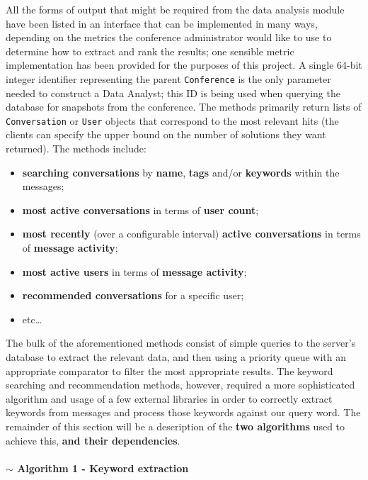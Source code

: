 \documentclass[12p, a4paper, onecolumn]{report}
\begin{document}
All the forms of output that might be required from the data analysis module have been listed in an interface that can be implemented in many ways, depending on the metrics the conference administrator would like to use to determine how to extract and rank the results; one sensible metric implementation has been provided for the purposes of this project. A single 64-bit integer identifier representing the parent \texttt{Conference} is the only parameter needed to construct a Data Analyst; this ID is being used when querying the database for snapshots from the conference. The methods primarily return lists of \texttt{Conversation} or \texttt{User} objects that correspond to the most relevant hits (the clients can specify the upper bound on the number of solutions they want returned). The methods include:
\begin{itemize}
\item \textbf{searching conversations} by \textbf{name}, \textbf{tags} and/or \textbf{keywords} within the messages;
\item \textbf{most active conversations} in terms of \textbf{user count};
\item \textbf{most recently} (over a configurable interval) \textbf{active conversations} in terms of \textbf{message activity};
\item \textbf{most active users} in terms of \textbf{message activity};
\item \textbf{recommended conversations} for a specific user;
\item etc\dots
\end{itemize}
The bulk of the aforementioned methods consist of simple queries to the server’s database to extract the relevant data, and then using a priority queue with an appropriate comparator to filter the most appropriate results. The keyword searching and recommendation methods, however, required a more sophisticated algorithm and usage of a few external libraries in order to correctly extract keywords from messages and process those keywords against our query word. The remainder of this section will be a description of the \textbf{two algorithms} used to achieve this, \textbf{and their dependencies}.

\paragraph{$\sim$ Algorithm 1 - Keyword extraction}
\end{document}
